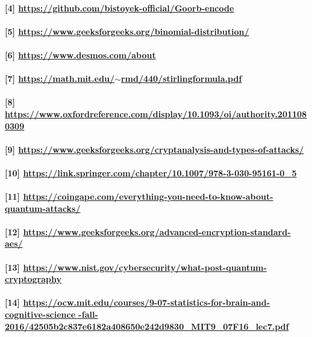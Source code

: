 \documentclass[oneside]{book}
\newcommand{\myparagraph}[1]{\paragraph{\textnormal{#1}}}
\begin{document}
\myparagraph{
[4] \href{https://github.com/bistoyek-official/Goorb-encode}{https://github.com/bistoyek-official/Goorb-encode}
}

\myparagraph{
[5] \href{https://www.geeksforgeeks.org/binomial-distribution/}{https://www.geeksforgeeks.org/binomial-distribution/}
}

\myparagraph{
[6] \href{https://www.desmos.com/about}{https://www.desmos.com/about}
}

\myparagraph{
[7] \href{https://math.mit.edu/~rmd/440/stirlingformula.pdf}{https://math.mit.edu/$\sim$rmd/440/stirlingformula.pdf}
}

\myparagraph{
[8] \href{https://www.oxfordreference.com/display/10.1093/oi/authority.20110803095508254}{https://www.oxfordreference.com/display/10.1093/oi/authority.2011080309\newline 254}
}

\myparagraph{
[9] \href{https://www.geeksforgeeks.org/cryptanalysis-and-types-of-attacks/}{https://www.geeksforgeeks.org/cryptanalysis-and-types-of-attacks/}
}

\myparagraph{
[10] \href{https://link.springer.com/chapter/10.1007/978-3-030-95161-0_5}{https://link.springer.com/chapter/10.1007/978-3-030-95161-0\_5}
}

\myparagraph{
[11] \href{https://coingape.com/everything-you-need-to-know-about-quantum-attacks/}{https://coingape.com/everything-you-need-to-know-about-quantum-attack\newline s/}
}

\myparagraph{
[12] \href{https://www.geeksforgeeks.org/advanced-encryption-standard-aes/}{https://www.geeksforgeeks.org/advanced-encryption-standard-aes/}}

\myparagraph{
[13] \href{https://www.nist.gov/cybersecurity/what-post-quantum-cryptography}{https://www.nist.gov/cybersecurity/what-post-quantum-cryptography}
}

\myparagraph{
[14] \href{https://ocw.mit.edu/courses/9-07-statistics-for-brain-and-cognitive-science-fall-2016/42505b2c837e6182a408650e242d9830_MIT9_07F16_lec7.pdf}{https://ocw.mit.edu/courses/9-07-statistics-for-brain-and-cognitive-science \newline -fall-2016/42505b2c837e6182a408650e242d9830\_MIT9\_07F16\_lec7.pdf}
}
\end{document}
